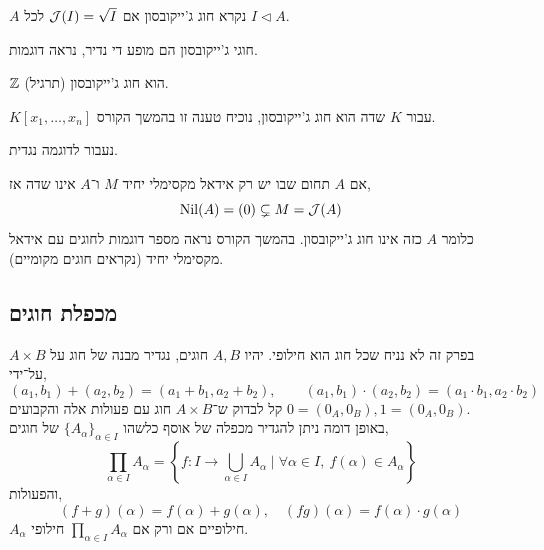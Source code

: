 \begin{definition}
	$A$ נקרא חוג ג'ייקובסון אם $\mathcal{J}(I) = \sqrt{I}$ לכל $I \triangleleft A$.
\end{definition}
חוגי ג'ייקובסון הם מופע די נדיר, נראה דוגמות.
\begin{example}
	$\mathbb{Z}$ הוא חוג ג'ייקובסון (תרגיל).
\end{example}
\begin{example}
	$K[x_1, \ldots, x_n]$ עבור $K$ שדה הוא חוג ג'ייקובסון, נוכיח טענה זו בהמשך הקורס.
\end{example}
נעבור לדוגמה נגדית.
\begin{example}
	אם $A$ תחום שבו יש רק אידאל מקסימלי יחיד $M$ ו־$A$ אינו שדה אז,
	\[
		\operatorname{Nil}(A)
		= (0)
		\subsetneq M
		= \mathcal{J}(A)
	\]
	כלומר $A$ כזה אינו חוג ג'ייקובסון.
	בהמשך הקורס נראה מספר דוגמות לחוגים עם אידאל מקסימלי יחיד (נקראים חוגים מקומיים).
\end{example}

\subsection{מכפלת חוגים}
בפרק זה לא נניח שכל חוג הוא חילופי.
יהיו $A, B$ חוגים, נגדיר מבנה של חוג על $A \times B$ על־ידי,
\[
	(a_1, b_1) + (a_2, b_2)
	= (a_1 + b_1, a_2 + b_2),
	\qquad
	(a_1, b_1) \cdot (a_2, b_2)
	= (a_1 \cdot b_1, a_2 \cdot b_2)
\]
קל לבדוק ש־$A \times B$ חוג עם פעולות אלה והקבועים $0 = (0_A, 0_B), 1 = (0_A, 0_B)$. \\
באופן דומה ניתן להגדיר מכפלה של אוסף כלשהו ${\{ A_{\alpha} \}}_{\alpha \in I}$ של חוגים,
\[
	\prod_{\alpha \in I} A_{\alpha}
	= \left\{ f : I \to \bigcup_{\alpha \in I} A_{\alpha} \mid \forall \alpha \in I,\ f(\alpha) \in A_{\alpha} \right\}
\]
והפעולות,
\[
	(f + g)(\alpha)
	= f(\alpha) + g(\alpha),
	\quad
	(f g)(\alpha) = f(\alpha) \cdot g(\alpha)
\]
$A_{\alpha}$ חילופיים אם ורק אם $\prod_{\alpha \in I} A_{\alpha}$ חילופי.

